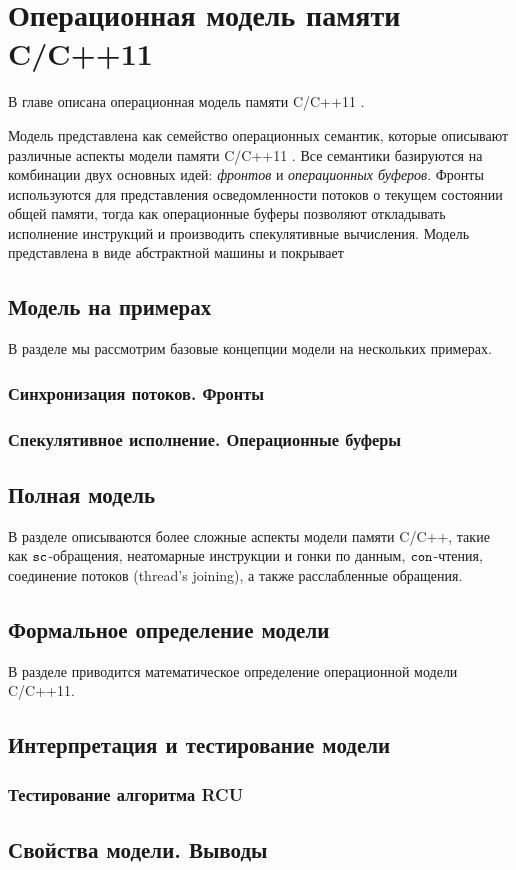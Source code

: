 \chapter{Операционная модель памяти C/C++11} \label{sec:opc11}
В главе описана операционная модель памяти C/C++11 \cite{Podkopaev-al:CoRR16}.


Модель представлена как семейство операционных семантик, которые описывают
различные аспекты модели памяти C/C++11 \cite{Batty-al:POPL11}.
Все семантики базируются на комбинации двух основных идей: 
\emph{фронтов} и \emph{операционных буферов}.
Фронты используются для представления осведомленности потоков о текущем состоянии общей памяти,
тогда как операционные буферы позволяют откладывать исполнение инструкций и
производить спекулятивные вычисления.
Модель представлена в виде абстрактной машины и покрывает 

\section{Модель на примерах}
В разделе мы рассмотрим базовые концепции модели на нескольких примерах.

\subsection{Синхронизация потоков. Фронты}
\subsection{Спекулятивное исполнение. Операционные буферы}

\section{Полная модель}
В разделе описываются более сложные аспекты модели памяти C/C++, такие как
${\mathtt{sc}}$-обращения, неатомарные инструкции и гонки по данным,
${\mathtt{con}}$-чтения, соединение потоков (thread's joining),
а также расслабленные обращения.

\section{Формальное определение модели}
В разделе приводится математическое определение операционной модели C/C++11.

\section{Интерпретация и тестирование модели}

\subsection{Тестирование алгоритма RCU}



\section{Свойства модели. Выводы}
